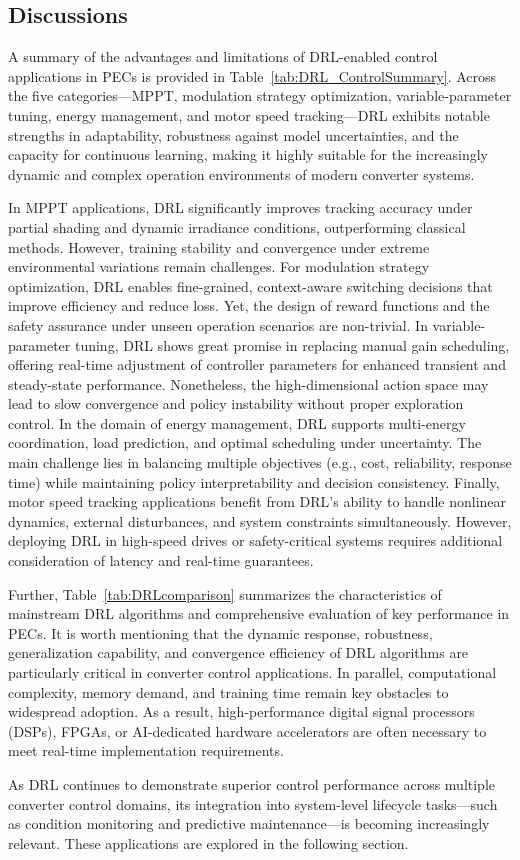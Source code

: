\subsection{Discussions}
\label{sec:ctrl_discuss}

A summary of the advantages and limitations of DRL-enabled control applications in PECs is provided in Table~\ref{tab:DRL_ControlSummary}. Across the five categories—MPPT, modulation strategy optimization, variable-parameter tuning, energy management, and motor speed tracking—DRL exhibits notable strengths in adaptability, robustness against model uncertainties, and the capacity for continuous learning, making it highly suitable for the increasingly dynamic and complex operation environments of modern converter systems.

In MPPT applications, DRL significantly improves tracking accuracy under partial shading and dynamic irradiance conditions, outperforming classical methods. However, training stability and convergence under extreme environmental variations remain challenges. For modulation strategy optimization, DRL enables fine-grained, context-aware switching decisions that improve efficiency and reduce loss. Yet, the design of reward functions and the safety assurance under unseen operation scenarios are non-trivial. In variable-parameter tuning, DRL shows great promise in replacing manual gain scheduling, offering real-time adjustment of controller parameters for enhanced transient and steady-state performance. Nonetheless, the high-dimensional action space may lead to slow convergence and policy instability without proper exploration control. In the domain of energy management, DRL supports multi-energy coordination, load prediction, and optimal scheduling under uncertainty. The main challenge lies in balancing multiple objectives (e.g., cost, reliability, response time) while maintaining policy interpretability and decision consistency. Finally, motor speed tracking applications benefit from DRL's ability to handle nonlinear dynamics, external disturbances, and system constraints simultaneously. However, deploying DRL in high-speed drives or safety-critical systems requires additional consideration of latency and real-time guarantees.

Further, Table~\ref{tab:DRLcomparison} summarizes the characteristics of mainstream DRL algorithms and comprehensive evaluation of key performance in PECs. It is worth mentioning that the dynamic response, robustness, generalization capability, and convergence efficiency of DRL algorithms are particularly critical in converter control applications. In parallel, computational complexity, memory demand, and training time remain key obstacles to widespread adoption. As a result, high-performance digital signal processors (DSPs), FPGAs, or AI-dedicated hardware accelerators are often necessary to meet real-time implementation requirements.

As DRL continues to demonstrate superior control performance across multiple converter control domains, its integration into system-level lifecycle tasks—such as condition monitoring and predictive maintenance—is becoming increasingly relevant. These applications are explored in the following section.

